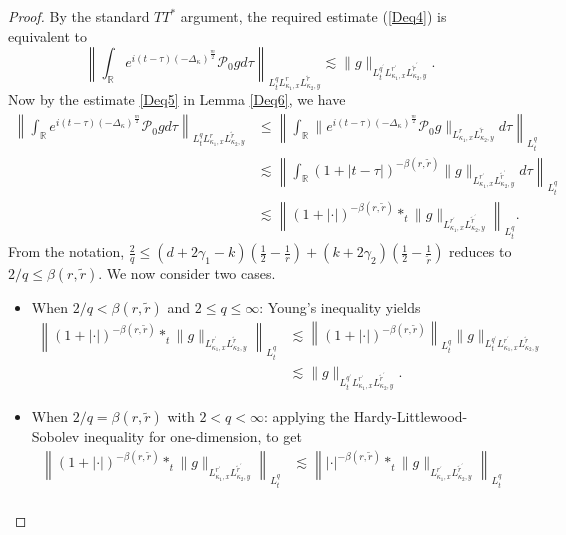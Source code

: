 \documentclass[a4paper,11pt, reqno]{amsart}
\theoremstyle{definition}
\theoremstyle{remark}
\numberwithin{equation}{section}
\begin{document}
	\begin{proof}
		By   the standard $T T^*$ argument,  the required estimate (\ref{Deq4})  is equivalent to
		$$
		\left\|\int_{\mathbb{R}} e^{i(t-\tau)(-\Delta_\kappa)^{\frac{m}{2}}} \mathcal{P}_0  g d \tau\right\|_{L_t^q L_{\kappa_1, x}^r L_{\kappa_2, y}^{\tilde{r}}} \lesssim\|g\|_{L_t^{q^{\prime}} L_{\kappa_1, x}^{r^{\prime}} L_{\kappa_2, y}^{\tilde{r}^{\prime}}}.
		$$
		Now  by  the estimate \eqref{Deq5} in Lemma \ref{Deq6}, we have
		$$
		\begin{aligned}
			\left\|\int_{\mathbb{R}} e^{i(t-\tau)(-\Delta_\kappa)^{\frac{m}{2}}} \mathcal{P}_0 g d \tau\right\|_{L_t^q L_{\kappa_1, x}^r L_{\kappa_2, y}^{\tilde{r}}} & \leq\left\|\int_{\mathbb{R}} \| e^{i(t-\tau)(-\Delta_\kappa)^{\frac{m}{2}}} \mathcal{P}_0 g \|_{L_{\kappa_1, x}^r L_{\kappa_2, y}^{\tilde{r}}} d \tau\right\|_{L_t^q} \\
			& \lesssim\left\|\int_{\mathbb{R}}  (1+|t-\tau|)^{-\beta(r, \widetilde{r})}\|g\|_{L_{\kappa_1, x}^{r^{\prime}} L_{\kappa_2, y}^{\tilde{r}^{\prime}}} d \tau\right\|_{L_t^q} \\
			& \lesssim\left\|(1+|\cdot|)^{-\beta(r, \widetilde{r})} *_t \| g \|_{L_{\kappa_1, x}^{r^{\prime}} L_{\kappa_2, y}^{\tilde{r}^{\prime}}}\right\|_{L_t^q}.
		\end{aligned}
		$$
		From the notation, $	\frac{2}{q} \leq(d+2\gamma_1-k)\left(\frac{1}{2}-\frac{1}{r}\right)+(k+2\gamma_2)\left(\frac{1}{2}-\frac{1}{\widetilde{r}}\right)$  reduces to   $2 / q \leq \beta(r, \tilde{r})$. We now consider two cases.
		\begin{itemize}
			\item When $2 / q<\beta(r, \tilde{r})$ and $2 \leq q \leq \infty$:    Young's inequality yields
			$$
			\begin{aligned}
				\left\|(1+|\cdot|)^{-\beta(r, \widetilde{r})} *_t \| g \|_{L_{\kappa_1, x}^{r^{\prime}} L_{\kappa_2, y}^{\widetilde{r}}}\right\|_{L_t^q} & \lesssim\left\|(1+|\cdot|)^{-\beta(r, \widetilde{r})}\right\|_{L_t^q}\|g\|_{L_t^{q^{\prime}} L_{\kappa_1, x}^{r^{\prime}} L_{\kappa_2, y}^{\widetilde{r}}} \\
				& \lesssim\|g\|_{L_t^{q^{\prime}} L_{\kappa_1, x}^{r^{\prime}} L_{\kappa_2, y}^{\widetilde{r}^{\prime}}}.
			\end{aligned}
			$$
			\item 	When $2 / q=\beta(r, \tilde{r})$ with $2<q<\infty$: applying  the Hardy-Littlewood-Sobolev inequality for one-dimension, to get
			$$
			\begin{aligned}
				\left\|(1+|\cdot|)^{- \beta(r, \tilde{r})} *_t \| g \|_{L_{\kappa_1, x}^{r^{\prime}} L_{\kappa_2, y}^{\tilde{r}^{\prime}}}\right\|_{L_t^q} & \lesssim\left\||\cdot|^{- \beta(r, \tilde{r})} *_t \| g \|_{L_{\kappa_1, x}^{r^{\prime}} L_{\kappa_2, y}^{\tilde{r}^{\prime}}}\right\|_{L_t^q} \\

\end{aligned}$$
\end{itemize}
\end{proof}
\end{document}

